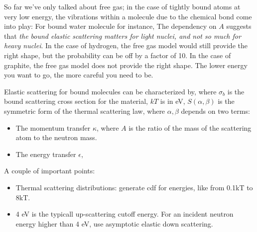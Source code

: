 \documentclass{school-22.211-notes}
\begin{document}
So far we've only talked about free gas; in the case of tightly bound atoms at very low energy, the vibrations within a molecule due to the chemical bond come into play:
For bound water molecule for instance, 
The dependency on $A$ suggests that \textit{the bound elastic scattering matters for light nuclei, and not so much for heavy nuclei}. In the case of hydrogen, the free gas model would still provide the right shape, but the probability can be off by a factor of 10. In the case of graphite, the free gas model does not provide the right shape. The lower energy you want to go, the more careful you need to be. 

Elastic scattering for bound molecules can be characterized by,
where $\sigma_b$ is the bound scattering cross section for the material, $kT$ is in eV, $S(\alpha, \beta)$ is the symmetric form of the thermal scattering law,
where $\alpha, \beta$ depends on two terms:
\begin{itemize}
\item The momentum transfer $\kappa$,
where $A$ is the ratio of the mass of the scattering atom to the neutron mass.
\item The energy transfer $\epsilon$,
\end{itemize}


A couple of important points:
\begin{itemize}
\item Thermal scattering distributions: generate cdf for energies, like from 0.1kT to 8kT.  
\item 4 eV is the typicall up-scattering cutoff energy. For an incident neutron energy higher than 4 eV, use asymptotic elastic down scattering. 
\end{itemize}
\end{document}
